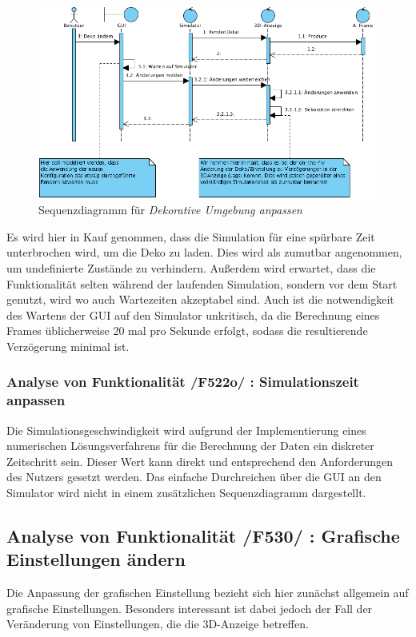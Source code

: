 \begin{figure}
\includegraphics[width=\linewidth]{bilder/change_graphic_deko}
\caption{Sequenzdiagramm für \textit{Dekorative Umgebung anpassen}}
\end{figure}
Es wird hier in Kauf genommen, dass die Simulation für eine spürbare Zeit unterbrochen wird, um die Deko zu laden. Dies wird als zumutbar angenommen, um undefinierte Zustände zu verhindern. 
Außerdem wird erwartet, dass die Funktionalität selten während der laufenden Simulation, sondern vor dem Start genutzt, wird wo auch Wartezeiten akzeptabel sind.
Auch ist die notwendigkeit des Wartens der GUI auf den Simulator unkritisch, da die Berechnung eines Frames üblicherweise 20 mal pro Sekunde erfolgt, sodass die resultierende Verzögerung minimal ist.

\subsubsection{Analyse von Funktionalität /F522o/ :  Simulationszeit anpassen}
Die Simulationsgeschwindigkeit wird aufgrund der Implementierung eines numerischen Lösungsverfahrens für die Berechnung der Daten ein diskreter Zeitschritt sein. Dieser Wert kann direkt und entsprechend
den Anforderungen des Nutzers gesetzt werden. Das einfache Durchreichen über die GUI an den Simulator wird nicht in einem zusätzlichen Sequenzdiagramm dargestellt.
\subsection{Analyse von Funktionalität /F530/ :  Grafische Einstellungen ändern}
Die Anpassung der grafischen Einstellung bezieht sich hier zunächst allgemein auf grafische Einstellungen. Besonders interessant ist dabei jedoch der Fall der Veränderung von Einstellungen, die 
die 3D-Anzeige betreffen. 

